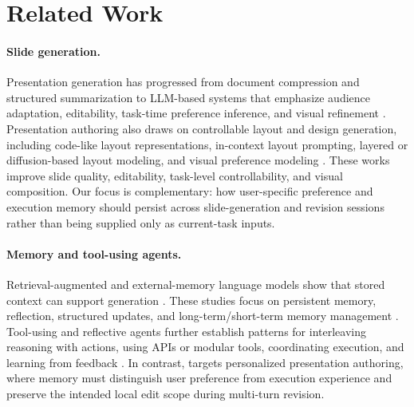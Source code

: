 \section{Related Work}

\paragraph{Slide generation.}
Presentation generation has progressed from document compression and
structured summarization to LLM-based systems that emphasize audience
adaptation, editability, task-time preference inference, and visual refinement
\citep{sun2021d2s,mondal2024personaaware,zheng2025pptagent,zeng2025slidetailor,zheng2026deeppresenter}.
Presentation authoring also draws on controllable layout and design generation,
including code-like layout representations, in-context layout prompting,
layered or diffusion-based layout modeling, and visual preference modeling
\citep{tang2023layoutnuwa,lin2023layoutprompter,inoue2023layoutdm,zhang2023layoutdiffusion,peng2025designpref}.
These works improve slide quality, editability, task-level controllability, and
visual composition. Our focus is complementary: how user-specific preference
and execution memory should persist across slide-generation and revision
sessions rather than being supplied only as current-task inputs.

\paragraph{Memory and tool-using agents.}
Retrieval-augmented and external-memory language models show that stored
context can support generation
\citep{lewis2020rag,guu2020realm,khandelwal2019knnlm,borgeaud2021retro,izacard2022atlas,wang2023longmem}.
These studies focus on
persistent memory, reflection, structured
updates, and long-term/short-term memory management
\citep{zhong2023memorybank,packer2023memgpt,park2023generativeagents,xu2025amem,chhikara2025mem0,wang2025mirix,kang2025memoryos,wu2025memoryage,yu2026agemem}.
Tool-using and reflective agents further establish patterns for interleaving
reasoning with actions, using APIs or modular tools, coordinating execution,
and learning from feedback
\citep{yao2023react,shinn2023reflexion,schick2023toolformer,patil2023gorilla,qin2023toolllm,li2023apibank,karpas2022mrkl,wu2023autogen,wang2023voyager,madaan2023selfrefine,nakano2021webgpt,ahn2022saycan,wang2022selfconsistency,yao2023treeofthoughts,hu2026agentictooluse}.
In contrast, \methodname targets personalized presentation authoring, where
memory must distinguish user preference from execution experience and preserve
the intended local edit scope during multi-turn revision.

